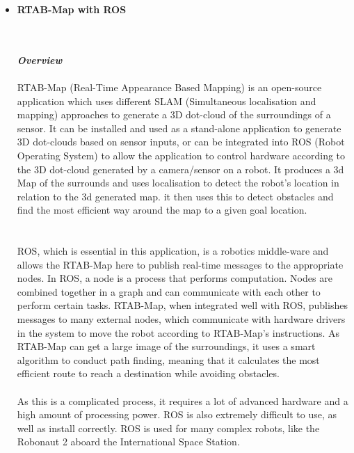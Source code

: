 \documentclass[11pt]{report}
\begin{document}
		\begin{itemize}
			\item{\textbf{RTAB-Map with ROS}}
				\\\\
					\begin{frame}{}
					\end{frame}
				\\
				\emph{\textbf{Overview}}
				\\\\RTAB-Map (Real-Time Appearance Based Mapping) is an open-source application which uses different SLAM (Simultaneous localisation and mapping) approaches to generate a 3D dot-cloud of the surroundings of a sensor. It can be installed and used as a stand-alone application to generate 3D dot-clouds based on sensor inputs, or can be integrated into ROS (Robot Operating System) to allow the application to control hardware according to the 3D dot-cloud generated by a camera/sensor on a robot. It produces a 3d Map of the surrounds and uses localisation to detect the robot's location in relation to the 3d generated map. it then uses this to detect obstacles and find the most efficient way around the map to a given goal location.\\\\\\ROS, which is essential in this application, is a robotics middle-ware and allows the RTAB-Map here to publish real-time messages to the appropriate nodes. In ROS, a node is a process that performs computation. Nodes are combined together in a graph and can communicate with each other to perform certain tasks. RTAB-Map, when integrated well with ROS, publishes messages to many external nodes, which communicate with hardware drivers in the system to move the robot according to RTAB-Map's instructions. As RTAB-Map can get a large image of the surroundings, it uses a smart algorithm to conduct path finding, meaning that it calculates the most efficient route to reach a destination while avoiding obstacles. \\\\As this is a complicated process, it requires a lot of advanced hardware and a high amount of processing power. ROS is also extremely difficult to use, as well as install correctly. ROS is used for many complex robots, like the Robonaut 2 aboard the International Space Station.
				\\\\

\end{itemize}
\end{document}
